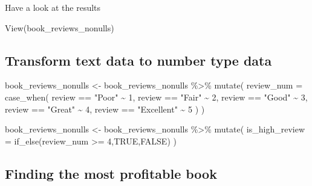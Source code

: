 \documentclass[
]{article}
\newenvironment{Shaded}{\begin{snugshade}}{\end{snugshade}}
\newcommand{\AttributeTok}[1]{\textcolor[rgb]{0.77,0.63,0.00}{#1}}
\newcommand{\ConstantTok}[1]{\textcolor[rgb]{0.00,0.00,0.00}{#1}}
\newcommand{\DecValTok}[1]{\textcolor[rgb]{0.00,0.00,0.81}{#1}}
\newcommand{\FunctionTok}[1]{\textcolor[rgb]{0.00,0.00,0.00}{#1}}
\newcommand{\NormalTok}[1]{#1}
\newcommand{\OtherTok}[1]{\textcolor[rgb]{0.56,0.35,0.01}{#1}}
\newcommand{\SpecialCharTok}[1]{\textcolor[rgb]{0.00,0.00,0.00}{#1}}
\newcommand{\StringTok}[1]{\textcolor[rgb]{0.31,0.60,0.02}{#1}}
\begin{document}
Have a look at the results

\begin{Shaded}
\begin{Highlighting}[]
\FunctionTok{View}\NormalTok{(book\_reviews\_nonulls)}
\end{Highlighting}
\end{Shaded}

\hypertarget{transform-text-data-to-number-type-data}{%
\subsection{Transform text data to number type
data}\label{transform-text-data-to-number-type-data}}

\begin{Shaded}
\begin{Highlighting}[]
\NormalTok{book\_reviews\_nonulls }\OtherTok{\textless{}{-}}\NormalTok{ book\_reviews\_nonulls }\SpecialCharTok{\%\textgreater{}\%}
  \FunctionTok{mutate}\NormalTok{(}
    \AttributeTok{review\_num =} \FunctionTok{case\_when}\NormalTok{(}
\NormalTok{      review }\SpecialCharTok{==} \StringTok{"Poor"} \SpecialCharTok{\textasciitilde{}} \DecValTok{1}\NormalTok{,}
\NormalTok{      review }\SpecialCharTok{==} \StringTok{"Fair"} \SpecialCharTok{\textasciitilde{}} \DecValTok{2}\NormalTok{,}
\NormalTok{      review }\SpecialCharTok{==} \StringTok{"Good"} \SpecialCharTok{\textasciitilde{}} \DecValTok{3}\NormalTok{,}
\NormalTok{      review }\SpecialCharTok{==} \StringTok{"Great"} \SpecialCharTok{\textasciitilde{}} \DecValTok{4}\NormalTok{,}
\NormalTok{      review }\SpecialCharTok{==} \StringTok{"Excellent"} \SpecialCharTok{\textasciitilde{}} \DecValTok{5}
\NormalTok{    )}
\NormalTok{  )}

\NormalTok{book\_reviews\_nonulls }\OtherTok{\textless{}{-}}\NormalTok{ book\_reviews\_nonulls }\SpecialCharTok{\%\textgreater{}\%}
  \FunctionTok{mutate}\NormalTok{(}
    \AttributeTok{is\_high\_review =} \FunctionTok{if\_else}\NormalTok{(review\_num }\SpecialCharTok{\textgreater{}=} \DecValTok{4}\NormalTok{,}\ConstantTok{TRUE}\NormalTok{,}\ConstantTok{FALSE}\NormalTok{) }
\NormalTok{  )}
\end{Highlighting}
\end{Shaded}

\hypertarget{finding-the-most-profitable-book}{%
\subsection{Finding the most profitable
book}\label{finding-the-most-profitable-book}}
\end{document}
